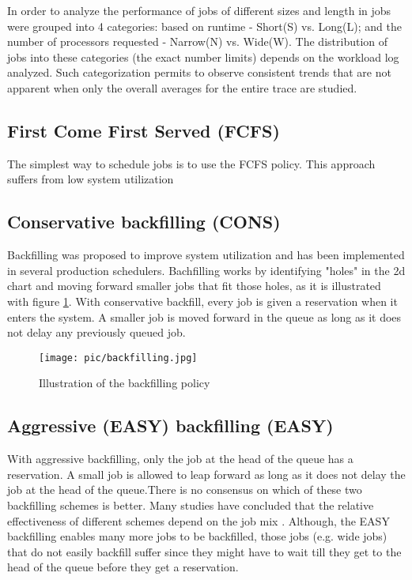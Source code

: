 \documentclass[a4paper,10pt]{article}
\begin{document}
In order to analyze the performance of jobs of different sizes and length in \cite{Backfilling} jobs were grouped into 4 categories: based on runtime - Short(S) vs. Long(L); and the number of processors requested - Narrow(N) vs. Wide(W). The distribution of jobs into these categories (the exact number limits) depends on the workload log analyzed. Such categorization permits to observe consistent trends that are not apparent when only the overall averages for the entire trace are studied.

\subsection{First Come First Served (FCFS)}
The simplest way to schedule jobs is to use the FCFS policy. This approach suffers from low system utilization \cite{Backfilling}
\subsection{Conservative backfilling (CONS)}
Backfilling was proposed to improve system utilization and has been implemented in several production schedulers. Bachfilling works by identifying "holes" in the 2d chart and moving forward smaller jobs that fit those holes, as it is illustrated with figure \ref{backfilling}. With conservative backfill, every job is given a reservation when it enters the system. A smaller job is moved forward in the queue as long as it does not delay any previously queued job. \cite{Backfilling}
\begin{figure}
\begin{center}
\texttt{[image: pic/backfilling.jpg]}
\caption{Illustration of the backfilling policy\cite{Rudova CP schedulling}}
\label{backfilling}
\end{center}
\end{figure}

\subsection{Aggressive (EASY) backfilling (EASY)}
With aggressive backfilling, only the job at the head of the queue has a reservation. A small job is allowed to leap forward as long as it does not delay the job at the head of the queue.There is no consensus on which of these two backfilling schemes is better. Many studies have concluded that the relative effectiveness of different schemes depend on the job mix \cite{Backfilling}. Although, the EASY backfilling enables many more jobs to be backfilled, those jobs (e.g. wide jobs) that do not easily backfill suffer since they might have to wait till they get to the head of the queue before they get a reservation. \cite{Backfilling}
\end{document}
